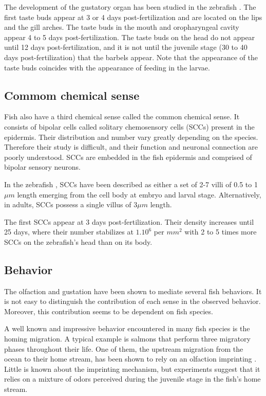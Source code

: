     The development of the gustatory organ has been studied in the zebrafish \cite{hansen2002taste}. The first taste buds appear at 3 or 4 days post-fertilization and are located on the lips and the gill arches. The taste buds in the mouth and oropharyngeal cavity appear 4 to 5 days post-fertilization. The taste buds on the head do not appear until 12 days post-fertilization, and it is not until the juvenile stage (30 to 40 days post-fertilization) that the barbels appear. Note that the appearance of the taste buds coincides with the appearance of feeding in the larvae.

    \subsection{Commom  chemical sense}
    Fish also have a third chemical sense called the common chemical sense. It consists of bipolar cells called solitary chemosensory cells (SCCs) present in the epidermis. Their distribution and number vary greatly depending on the species. Therefore their study is difficult, and their function and neuronal connection are poorly understood. SCCs are embedded in the fish epidermis and comprised of bipolar sensory neurons.

    In the zebrafish \cite{kotrschal1997ontogeny}, SCCs have been described as either a set of 2-7 villi of 0.5 to 1 $\mu m$ length emerging from the cell body at embryo and larval stage.  Alternatively, in adults, SCCs possess a single villus of $3\mu m$ length.

    The first SCCs appear at 3 days post-fertilization. Their density increases until 25 days, where their number stabilizes at $1.10^6$ per $mm^2$ with 2 to 5 times more SCCs on the zebrafish's head than on its body.

    \subsection{Behavior}
    The olfaction and gustation have been shown to mediate several fish behaviors. It is not easy to distinguish the contribution of each sense in the observed behavior. Moreover, this contribution seems to be dependent on fish species.

    A well known and impressive behavior encountered in many fish species is the homing migration. A typical example is salmons that perform three migratory phases throughout their life. One of them, the upstream migration from the ocean to their home stream, has been shown to rely on an olfaction imprinting \cite{stabell1992olfactory, hasler1983olfactory}. Little is known about the imprinting mechanism, but experiments suggest that it relies on a mixture of odors perceived during the juvenile stage in the fish's home stream.

